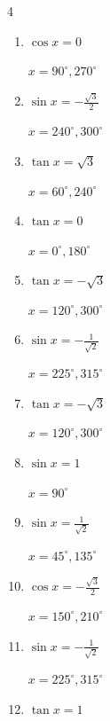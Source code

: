 \begin{multicols}{4}
\begin{enumerate}
        $\displaystyle x = 30^{\circ} , 210^{\circ}$

  \item $\displaystyle \cos{x}  = 0$

        $\displaystyle x = 90^{\circ} , 270^{\circ}$

  \item $\displaystyle \sin{x}  = -\frac{\sqrt{3}}{2}$

        $\displaystyle x = 240^{\circ} , 300^{\circ}$

  \item $\displaystyle \tan{x}  = \sqrt{3}$

        $\displaystyle x = 60^{\circ} , 240^{\circ}$

  \item $\displaystyle \tan{x}  = 0$

        $\displaystyle x = 0^{\circ} , 180^{\circ}$

\columnbreak %

  \item $\displaystyle \tan{x}  = -\sqrt{3}$

        $\displaystyle x = 120^{\circ} , 300^{\circ}$

  \item $\displaystyle \sin{x}  = -\frac{1}{\sqrt{2}}$

        $\displaystyle x = 225^{\circ} , 315^{\circ}$

  \item $\displaystyle \tan{x}  = -\sqrt{3}$

        $\displaystyle x = 120^{\circ} , 300^{\circ}$

  \item $\displaystyle \sin{x}  = 1$

        $\displaystyle x = 90^{\circ}$

  \item $\displaystyle \sin{x}  = \frac{1}{\sqrt{2}}$

        $\displaystyle x = 45^{\circ} , 135^{\circ}$

  \item $\displaystyle \cos{x}  = -\frac{\sqrt{3}}{2}$

        $\displaystyle x = 150^{\circ} , 210^{\circ}$

  \item $\displaystyle \sin{x}  = -\frac{1}{\sqrt{2}}$

        $\displaystyle x = 225^{\circ} , 315^{\circ}$

  \item $\displaystyle \tan{x}  = 1$


\end{enumerate}
\end{multicols}
